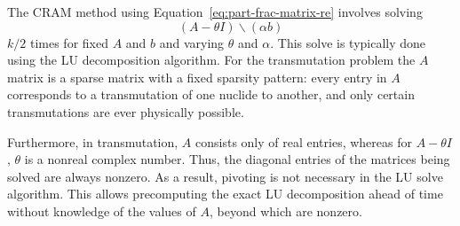 The CRAM method using Equation~\ref{eq:part-frac-matrix-re} involves solving
\begin{equation}
\label{eq:basic-matrix-solve}
 (A - \theta I)\backslash(\alpha b)
\end{equation}
$k/2$ times for fixed $A$ and $b$ and varying $\theta$ and $\alpha$. This
solve is typically done using the LU decomposition algorithm. For the
transmutation problem the $A$ matrix is a sparse matrix with a fixed sparsity
pattern: every entry in $A$ corresponds to a transmutation of one nuclide to
another, and only certain transmutations are ever physically possible.

Furthermore, in transmutation, $A$ consists only of real entries, whereas for
$A - \theta I$, $\theta$ is a nonreal complex number. Thus, the diagonal
entries of the matrices being solved are always nonzero. As a result, pivoting
is not necessary in the LU solve algorithm. This allows precomputing the exact
LU decomposition ahead of time without knowledge of the values of $A$, beyond
which are nonzero.

